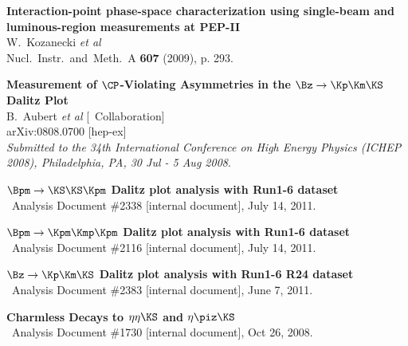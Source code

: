 \documentclass[12pt,letterpaper]{MACPcv}
\newcommand{\bkkkboth}{\ensuremath{ \Bpm \rightarrow \Kpm\Kmp\Kpm}\xspace}
\newcommand{\bkksks}{\ensuremath{ \Bpm \rightarrow \KS\KS\Kpm}\xspace}
\newcommand{\bkkks}{\ensuremath{\Bz \rightarrow \Kp\Km\KS}\xspace}
\begin{document}
\begin{cv}
\begin{Simplelist}

\end{Simplelist}



\begin{publications}

  \begin{Simplelist}

\item
{\bf Interaction-point phase-space characterization using single-beam and luminous-region measurements at PEP-II}
\\{}W.~Kozanecki {\it et al}
\\{}Nucl.\ Instr.\ and\ Meth.\ A {\bf 607} (2009), p. 293.


\item
{\bf Measurement of {\boldmath $\CP$}-Violating Asymmetries in the {\boldmath $\Bz\to\Kp\Km\KS$} Dalitz Plot}
\\{} B.~Aubert {\it et al} [\babar\ Collaboration]
\\{} arXiv:0808.0700 [hep-ex]
\\{} {\it Submitted to the 34th International Conference on High
Energy Physics (ICHEP 2008), Philadelphia, PA, 30 Jul - 5 Aug 2008}.



\item
{\bf {\boldmath \bkksks} Dalitz plot analysis with Run1-6 dataset}
\\ {}\babar\ Analysis Document \#2338 [internal document], July 14, 2011.

\item
{\bf {\boldmath \bkkkboth} Dalitz plot analysis with Run1-6 dataset}
\\ {}\babar\ Analysis Document \#2116 [internal document], July 14, 2011.


\item
{\bf {\boldmath \bkkks} Dalitz plot analysis with Run1-6 R24 dataset}
\\ {}\babar\ Analysis Document \#2383 [internal document], June 7, 2011.


\item
{\bf Charmless {\boldmath \B} Decays to {\boldmath $\eta\eta\KS$} and {\boldmath $\eta\piz\KS$}}
\\ {}\babar\ Analysis Document \#1730 [internal document], Oct 26, 2008.



\end{Simplelist}
\end{publications}
\end{cv}
\end{document}
